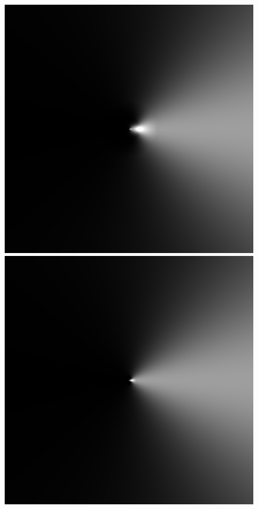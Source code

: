 %
\begin{figure}
 \centering
 \subtop
 {
 \includegraphics[scale=0.115]{figures/donelan_dfilt_wr_sqrt2.png}
 }
 \hfill
 \subtop
 {
 \includegraphics[scale=0.115]{figures/donelan_dfilt_wr_sqrt8.png}
}
\end{figure}
